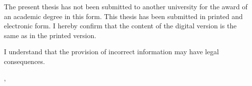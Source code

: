 \begin{titlepage}
{The present thesis has not been submitted to another university 
for the award of an academic degree in this form. This thesis 
has been submitted in printed and electronic form. I hereby 
confirm that the content of the digital version is the same 
as in the printed version.

I understand that the provision of incorrect information may 
have legal consequences.


}%


\vspace{1,5cm}
\yourPlace, \submissionDate

\flushright
\vspace{15mm}
\yourName


\end{titlepage}





